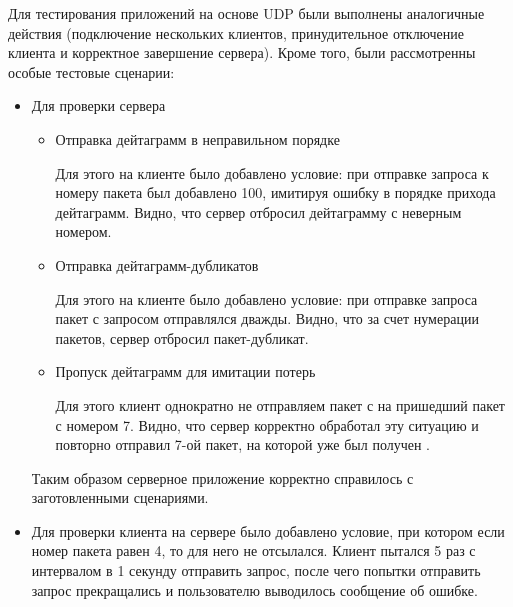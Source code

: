 Для тестирования приложений на основе UDP были выполнены аналогичные действия (подключение нескольких клиентов, принудительное отключение клиента и корректное завершение сервера). Кроме того, были рассмотренны особые тестовые сценарии:
\begin{itemize}
	\item Для проверки сервера

	\begin{itemize}
		\item Отправка дейтаграмм в неправильном порядке
		
		Для этого на клиенте было добавлено условие: при отправке запроса  к номеру пакета был добавлено 100, имитируя ошибку в порядке прихода дейтаграмм. Видно, что сервер отбросил дейтаграмму с неверным номером.
		
		
		
		
		\item Отправка дейтаграмм-дубликатов
		
		Для этого на клиенте было добавлено условие: при отправке запроса  пакет с запросом отправлялся дважды. Видно, что за счет нумерации пакетов, сервер отбросил пакет-дубликат.
		
		
		
		
		\item Пропуск дейтаграмм для имитации потерь
		
		Для этого клиент однократно не отправляем пакет с  на пришедший пакет с номером 7. Видно, что сервер корректно обработал эту ситуацию и повторно отправил 7-ой пакет, на которой уже был получен .
		
		
		
	\end{itemize}
	Таким образом серверное приложение корректно справилось с заготовленными сценариями.
	
	\item Для проверки клиента на сервере было добавлено условие, при котором если номер пакета равен 4, то  для него не отсылался. Клиент пытался 5 раз с интервалом в 1 секунду отправить запрос, после чего попытки отправить запрос прекращались и пользователю выводилось сообщение об ошибке.
	
	
	

\end{itemize}


